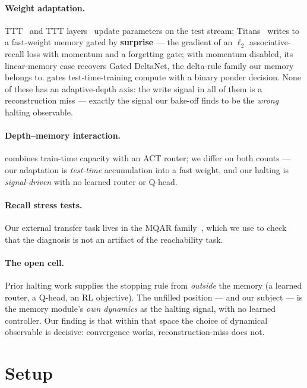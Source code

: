 \documentclass{article}
\begin{document}
\paragraph{Weight adaptation.} TTT~\citep{sun2020ttt} and TTT
layers~\citep{sun2024tttlayers} update parameters on the test stream;
Titans~\citep{behrouz2025titans} writes to a fast-weight memory gated by
\textbf{surprise} --- the gradient of an $\ell_2$ associative-recall loss with
momentum and a forgetting gate; with momentum disabled, its linear-memory case
recovers Gated DeltaNet, the delta-rule family our memory belongs to.
\citet{ponderttt2026} gates test-time-training compute with a binary ponder
decision. None of these has an adaptive-depth axis: the write signal in all of
them is a reconstruction miss --- exactly the signal our bake-off finds to be
the \emph{wrong} halting observable.

\paragraph{Depth--memory interaction.} \citet{utmemory2026} combines
train-time capacity with an ACT router; we differ on both counts --- our
adaptation is \emph{test-time} accumulation into a fast weight, and our halting
is \emph{signal-driven} with no learned router or Q-head.

\paragraph{Recall stress tests.} Our external transfer task lives in the MQAR
family~\citep{arora2023zoology,arora2024based,fu2023h3,yang2024deltanet,yang2024gateddeltanet},
which we use to check that the diagnosis is not an artifact of the reachability
task.

\paragraph{The open cell.} Prior halting work supplies the stopping rule from
\emph{outside} the memory (a learned router, a Q-head, an RL objective). The
unfilled position --- and our subject --- is the memory module's \emph{own
dynamics} as the halting signal, with no learned controller. Our finding is
that within that space the choice of dynamical observable is decisive:
convergence works, reconstruction-miss does not.

\section{Setup}
\end{document}
